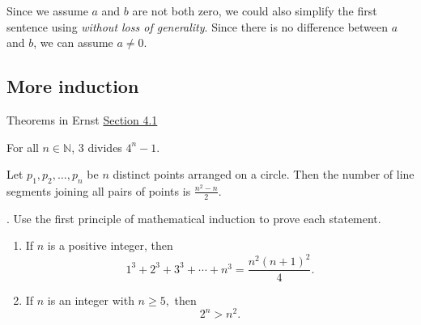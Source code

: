 \documentclass{ximera}
\begin{document}
Since we assume $a$ and $b$ are not both zero, we could also simplify the first sentence using \emph{without loss of generality}. Since there is no difference between $a$ and $b$, we can assume $a\neq0$.

\subsection{More induction}


\begin{br}
Theorems in Ernst \href{https://danaernst.com/IBL-IntroToProof/pretext/sec_Intro_to_Induction.html}{Section 4.1} 
 

\begin{thm*}
For all $n\in\mathbb{N}$, 3 divides $4^{n}-1$.
\end{thm*}


 \begin{thm*}
 Let $p_{1}, p_{2}, \ldots, p_{n}$ be $n$ distinct points arranged on a circle.  Then the number of line segments joining all pairs of points is $\frac{n^{2}-n}{2}$.
 \end{thm*}

\end{br}

\begin{br}
. Use the first principle of mathematical induction to prove each statement.
\begin{enumerate}%
\addtocounter{enumi}{1}
  \item If $n$ is a positive integer, then 
  \[1^3+2^3+3^3+\cdots+n^3=\frac{n^2(n+1)^2}{4}.\]

 \item If $n$ is an integer with $n\geq 5,$ then \[2^n>n^2.\]

\end{enumerate}
\end{br}
\end{document}
